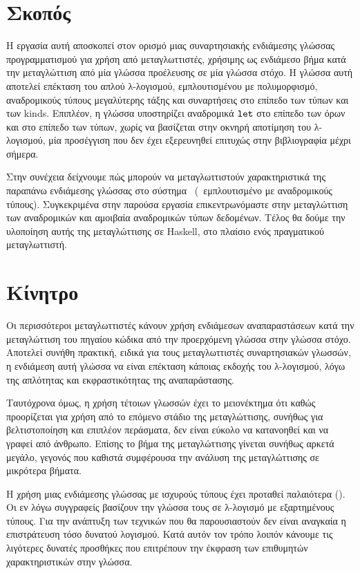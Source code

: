 \section{Σκοπός}

Η εργασία αυτή αποσκοπεί στον ορισμό μιας συναρτησιακής ενδιάμεσης γλώσσας
προγραμματισμού για χρήση από μεταγλωττιστές, χρήσιμης ως ενδιάμεσο βήμα κατά
την μεταγλώττιση από μία γλώσσα προέλευσης σε μία γλώσσα στόχο. Η γλώσσα αυτή
αποτελεί επέκταση του απλού λ-λογισμού, εμπλουτισμένου με πολυμορφισμό,
αναδρομικούς τύπους μεγαλύτερης τάξης και συναρτήσεις στο επίπεδο των τύπων και
των kinds. Επιπλέον, η γλώσσα υποστηρίζει αναδρομικά $\operatorname{\texttt{let}}$ στο επίπεδο των
όρων και στο επίπεδο των τύπων, χωρίς να βασίζεται στην οκνηρή αποτίμηση του
λ-λογισμού, μία προσέγγιση που δεν έχει εξερευνηθεί επιτυχώς στην
βιβλιογραφία μέχρι σήμερα.

Στην συνέχεια δείχνουμε πώς μπορούν να μεταγλωττιστούν χαρακτηριστικά της
παραπάνω ενδιάμεσης γλώσσας στο σύστημα \FOMF ~(\FOM ~εμπλουτισμένο με
αναδρομικούς τύπους). Συγκεκριμένα στην παρούσα εργασία επικεντρωνόμαστε στην
μεταγλώττιση των αναδρομικών και αμοιβαία αναδρομικών τύπων δεδομένων. Τέλος
θα δούμε την υλοποίηση αυτής της μεταγλώττισης σε Haskell, στο πλαίσιο ενός
πραγματικού μεταγλωττιστή.

\section{Κίνητρο}

Οι περισσότεροι μεταγλωττιστές κάνουν χρήση ενδιάμεσων αναπαραστάσεων κατά
την μεταγλώττιση του πηγαίου κώδικα από την προερχόμενη γλώσσα στην γλώσσα
στόχο. Αποτελεί συνήθη πρακτική, ειδικά για τους μεταγλωττιστές συναρτησιακών
γλωσσών, η ενδιάμεση αυτή γλώσσα να είναι επέκταση κάποιας εκδοχής του
λ-λογισμού, λόγω της απλότητας και εκφραστικότητας της αναπαράστασης.

Ταυτόχρονα όμως, η χρήση τέτοιων γλωσσών έχει το μειονέκτημα ότι καθώς
προορίζεται για χρήση από το επόμενο στάδιο της μεταγλώττισης, συνήθως για
βελτιστοποίηση και επιπλέον περάσματα, δεν είναι εύκολο να κατανοηθεί και να
γραφεί από άνθρωπο. Επίσης το βήμα της μεταγλώττισης γίνεται συνήθως αρκετά
μεγάλο, γεγονός που καθιστά συμφέρουσα την ανάλυση της μεταγλώττισης σε
μικρότερα βήματα.

Η χρήση μιας ενδιάμεσης γλώσσας με ισχυρούς τύπους έχει προταθεί παλαιότερα
(\cite{henk}). Οι εν λόγω συγγραφείς βασίζουν την γλώσσα τους σε λ-λογισμό με
εξαρτημένους τύπους. Για την ανάπτυξη των τεχνικών που θα παρουσιαστούν δεν
είναι αναγκαία η επιστράτευση τόσο δυνατού λογισμού. Κατά αυτόν τον τρόπο
λοιπόν κάνουμε τις λιγότερες δυνατές προσθήκες που επιτρέπουν την έκφραση των
επιθυμητών χαρακτηριστικών στην γλώσσα.


